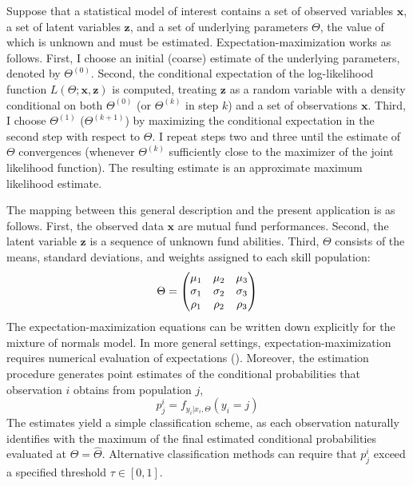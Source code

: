 		Suppose that a statistical model of interest contains a set of observed variables $\mathbf{x}$, a set of latent variables $\mathbf{z}$, and a set of underlying parameters $\Theta$, the value of which is unknown and must be estimated.  Expectation-maximization works as follows.  First, I choose an initial (coarse) estimate of the underlying parameters, denoted by $\Theta^{(0)}$.  Second, the conditional expectation of the log-likelihood function $L(\Theta; \mathbf{x}, \mathbf{z})$ is computed, treating $\mathbf{z}$ as a random variable with a density conditional on both $\Theta^{(0)}$ (or $\Theta^{(k)}$ in step $k$) and a set of observations $\mathbf{x}$.  Third, I choose $\Theta^{(1)}$ ($\Theta^{(k+1)}$) by maximizing the conditional expectation in the second step with respect to $\Theta$.  I repeat steps two and three until the estimate of $\Theta$ convergences (whenever $\Theta^{(k)}$ sufficiently close to the maximizer of the joint likelihood function).  The resulting estimate is an approximate maximum likelihood estimate.

		The mapping between this general description and the present application is as follows.  First, the observed data $\mathbf{x}$ are mutual fund performances.  Second, the latent variable $\mathbf{z}$ is a sequence of unknown fund abilities.  Third, $\Theta$ consists of the means, standard deviations, and weights assigned to each skill population:
		\vspace{4mm}
		\begin{equation} \label{eqn:mixture}
			\Theta = \begin{pmatrix} \mu_1 & \mu_2 & \mu_3 \\ \sigma_1 & \sigma_2 & \sigma_3 \\ \rho_1 & \rho_2 & \rho_3 \end{pmatrix}
			\vspace{3mm}
		\end{equation}
		The expectation-maximization equations can be written down explicitly for the mixture of normals model. In more general settings, expectation-maximization requires numerical evaluation of expectations (\citet{Casella2010}). Moreover, the estimation procedure generates point estimates of the conditional probabilities that observation $i$ obtains from population $j$,
		\begin{equation}
			\label{eq:posterior}
			p_j^i = f_{ y_i | x_i, \Theta}(y_i = j)
		\end{equation}
		The estimates yield a simple classification scheme, as each observation naturally identifies with the maximum of the final estimated conditional probabilities evaluated at $\Theta = \hat{\Theta}$.  Alternative classification methods can require that $p_j^i$ exceed a specified threshold $\tau \in [0, 1]$.

